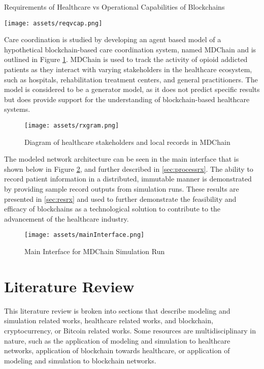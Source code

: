 \documentclass[12pt]{report}
\begin{document}
\begin{table}[h]
\begin{center}
\caption{Requirements of Healthcare vs Operational Capabilities of Blockchains}
\texttt{[image: assets/reqvcap.png]}
\label{table:reqvcap2}
\end{center}
\end{table}

Care coordination is studied by developing an agent based model of a hypothetical blockchain-based care coordination system, named MDChain and is outlined in Figure \ref{fig:rxgram2}. MDChain is used to track the activity of opioid addicted patients as they interact with varying stakeholders in the healthcare ecosystem, such as hospitals, rehabilitation treatment centers, and general practitioners. The model is considered to be a generator model, as it does not predict specific results but does provide support for the understanding of blockchain-based healthcare systems. 


\begin{figure}[h!]
\begin{center}
\texttt{[image: assets/rxgram.png]}
\end{center}
\caption{Diagram of healthcare stakeholders and local records in MDChain}
\label{fig:rxgram2}
\end{figure}

The modeled network architecture can be seen in the main interface that is shown below in Figure \ref{fig:mainlay2}, and further described in \autoref{sec:processrx}. The ability to record patient information in a distributed, immutable manner is demonstrated by providing sample record outputs from simulation runs. These results are presented in \autoref{sec:resrx} and used to further demonstrate the feasibility and efficacy of blockchains as a technological solution to contribute to the advancement of the healthcare industry.


\begin{figure}[!h]
\begin{center}
\texttt{[image: assets/mainInterface.png]}
\end{center}
\caption{Main Interface for MDChain Simulation Run}
\label{fig:mainlay2}
\end{figure}


\chapter{Literature Review}
This literature review is broken into sections that describe modeling and simulation related works, healthcare related works, and blockchain, cryptocurrency, or Bitcoin related works. Some resources are multidisciplinary in nature, such as the application of modeling and simulation to healthcare networks, application of blockchain towards healthcare, or application of modeling and simulation to blockchain networks.
\end{document}
